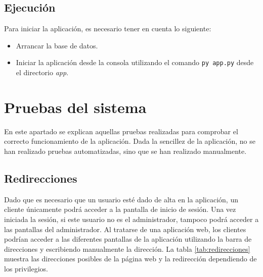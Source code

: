 \subsection{Ejecución}
Para iniciar la aplicación, es necesario tener en cuenta lo siguiente:

\begin{itemize}
	\item Arrancar la base de datos.
	\item Iniciar la aplicación desde la consola utilizando el comando \texttt{py app.py} desde el directorio \textit{app}.
\end{itemize}

\section{Pruebas del sistema}
En este apartado se explican aquellas pruebas realizadas para comprobar el correcto funcionamiento de la aplicación. Dada la sencillez de la aplicación, no se han realizado pruebas automatizadas, sino que se han realizado manualmente.

\subsection{Redirecciones}
Dado que es necesario que un usuario esté dado de alta en la aplicación, un cliente únicamente podrá acceder a la pantalla de inicio de sesión. Una vez iniciada la sesión, si este usuario no es el administrador, tampoco podrá acceder a las pantallas del administrador. Al tratarse de una aplicación web, los clientes podrían acceder a las diferentes pantallas de la aplicación utilizando la barra de direcciones y escribiendo manualmente la dirección. La tabla \ref{tab:redirecciones} muestra las direcciones posibles de la página web y la redirección dependiendo de los privilegios.

